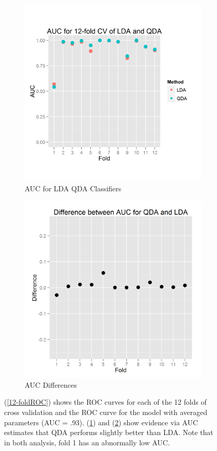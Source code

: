 \documentclass{article}\usepackage[]{graphicx}\usepackage[]{color}
\begin{document}
\begin{figure}[h]
\begin{subfigure}[b]{0.3\textwidth}
    \includegraphics[width=\linewidth]{AUC_12_folds_DA.png}
    \caption{AUC for LDA QDA Classifiers}
    \label{12-foldAUC}
  \end{subfigure}  
  \begin{subfigure}[b]{0.3\textwidth}
    \includegraphics[width=\linewidth]{AUC_difference.png}
    \caption{AUC Differences}
    \label{12-foldAUCdiff}
  \end{subfigure}    
  \caption{(\ref{12-foldROC}) shows the ROC curves for each of the 12 folds of cross validation and the ROC curve for the model with averaged parameters (AUC = .93).  (\ref{12-foldAUC}) and (\ref{12-foldAUCdiff}) show evidence via AUC estimates that QDA performs slightly better than LDA.  Note that in both analysis, fold 1 has an abnormally low AUC.}
  \label{fig:qda_lda}
\end{figure}
\end{document}
